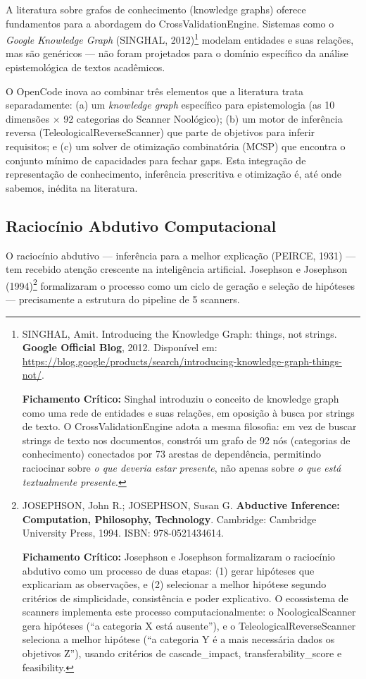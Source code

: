 A literatura sobre grafos de conhecimento (knowledge graphs) oferece fundamentos para a abordagem do CrossValidationEngine. Sistemas como o \textit{Google Knowledge Graph} (SINGHAL, 2012)\footnote{
  SINGHAL, Amit. Introducing the Knowledge Graph: things, not strings. \textbf{Google Official Blog}, 2012. Disponível em: \url{https://blog.google/products/search/introducing-knowledge-graph-things-not/}.

  \textbf{Fichamento Crítico:} Singhal introduziu o conceito de knowledge graph como uma rede de entidades e suas relações, em oposição à busca por strings de texto. O CrossValidationEngine adota a mesma filosofia: em vez de buscar strings de texto nos documentos, constrói um grafo de 92 nós (categorias de conhecimento) conectados por 73 arestas de dependência, permitindo raciocinar sobre \textit{o que deveria estar presente}, não apenas sobre \textit{o que está textualmente presente}.
} modelam entidades e suas relações, mas são genéricos --- não foram projetados para o domínio específico da análise epistemológica de textos acadêmicos.

O OpenCode inova ao combinar três elementos que a literatura trata separadamente: (a) um \textit{knowledge graph} específico para epistemologia (as 10 dimensões $\times$ 92 categorias do Scanner Noológico); (b) um motor de inferência reversa (TeleologicalReverseScanner) que parte de objetivos para inferir requisitos; e (c) um solver de otimização combinatória (MCSP) que encontra o conjunto mínimo de capacidades para fechar gaps. Esta integração de representação de conhecimento, inferência prescritiva e otimização é, até onde sabemos, inédita na literatura.

\subsection{Raciocínio Abdutivo Computacional}

O raciocínio abdutivo --- inferência para a melhor explicação (PEIRCE, 1931) --- tem recebido atenção crescente na inteligência artificial. Josephson e Josephson (1994)\footnote{
  JOSEPHSON, John R.; JOSEPHSON, Susan G. \textbf{Abductive Inference: Computation, Philosophy, Technology}. Cambridge: Cambridge University Press, 1994. ISBN: 978-0521434614.

  \textbf{Fichamento Crítico:} Josephson e Josephson formalizaram o raciocínio abdutivo como um processo de duas etapas: (1) gerar hipóteses que explicariam as observações, e (2) selecionar a melhor hipótese segundo critérios de simplicidade, consistência e poder explicativo. O ecossistema de scanners implementa este processo computacionalmente: o NoologicalScanner gera hipóteses (``a categoria X está ausente''), e o TeleologicalReverseScanner seleciona a melhor hipótese (``a categoria Y é a mais necessária dados os objetivos Z''), usando critérios de cascade\_impact, transferability\_score e feasibility.
} formalizaram o processo como um ciclo de geração e seleção de hipóteses --- precisamente a estrutura do pipeline de 5 scanners.

